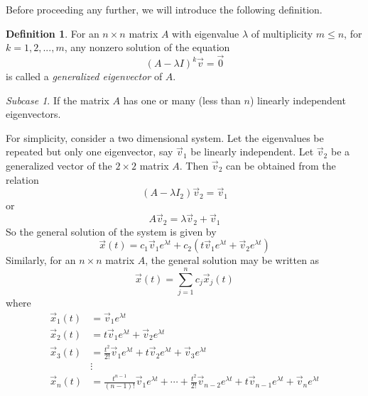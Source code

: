 \documentclass[11pt]{book}
\theoremstyle{definition}\newtheorem{definition}[subsection]{Definition}
\theoremstyle{definition}\newtheorem{example}[subsection]{Example}
\theoremstyle{definition}\newtheorem{notation}[subsection]{Notation}
\theoremstyle{definition}\newtheorem{remark}[subsection]{Remark}
\theoremstyle{theorem}\newtheorem{theorem}[subsection]{Theorem}
\theoremstyle{theorem}\newtheorem{lemma}[subsection]{Lemma}
\theoremstyle{theorem}\newtheorem{proposition}[subsection]{Proposition}
\theoremstyle{theorem}\newtheorem{corollary}[subsection]{Corollary}
\theoremstyle{theorem}\newtheorem{case}{Case}
\theoremstyle{remark}\newtheorem{subcase}{Subcase}[case]
\begin{document}
Before proceeding any further, we will introduce the following definition.

\begin{definition}\label{definition:1.2.1}
    For an $n \times n$ matrix $A$ with eigenvalue $\lambda$ of multiplicity $m \leq n$, for $k = 1, 2,..., m$, any nonzero solution of the equation
    \begin{equation*}
        (A - \lambda I)^k\vec{v} = \vec{0}
    \end{equation*}
    is called a \emph{generalized eigenvector} of $A$. 
\end{definition}

\begin{subcase}
    If the matrix $A$ has one or many (less than $n$) linearly independent eigenvectors. 
\end{subcase}

For simplicity, consider a two dimensional system. Let the eigenvalues be repeated but only one eigenvector, say $\vec{v}_1$ be linearly independent. Let $\vec{v}_2$ be a generalized vector of the $2 \times 2$ matrix $A$. Then $\vec{v}_2$ can be obtained from the relation
\begin{equation*}
    (A - \lambda I_2)\vec{v}_2 = \vec{v}_1
\end{equation*}
or
\begin{equation*}
    A\vec{v}_2 = \lambda \vec{v}_2 + \vec{v}_1
\end{equation*}
So the general solution of the system is given by
\begin{equation*}
    \vec{x}(t) = c_1\vec{v}_1e^{\lambda t} + c_2(t\vec{v}_1e^{\lambda t} + \vec{v}_2e^{\lambda t})
\end{equation*}
Similarly, for an $n \times n$ matrix $A$, the general solution may be written as
\begin{equation*}
    \vec{x}(t) = \sum_{j = 1}^{n} c_j\vec{x}_j(t)
\end{equation*}
where
\begin{align*}
    \vec{x}_1(t) &= \vec{v}_1e^{\lambda t} \\
    \vec{x}_2(t) &= t\vec{v}_1e^{\lambda t} + \vec{v}_2e^{\lambda t} \\
    \vec{x}_3(t) &= \frac{t^2}{2!}\vec{v}_1e^{\lambda t} + t\vec{v}_2e^{\lambda t} + \vec{v}_3e^{\lambda t} \\
    &\vdots \\
    \vec{x}_n(t) &= \frac{t^{n - 1}}{(n - 1)!}\vec{v}_1e^{\lambda t} + \cdots + \frac{t^2}{2!}\vec{v}_{n - 2}e^{\lambda t} + t\vec{v}_{n - 1}e^{\lambda t} + \vec{v}_ne^{\lambda t}
\end{align*}
\end{document}
